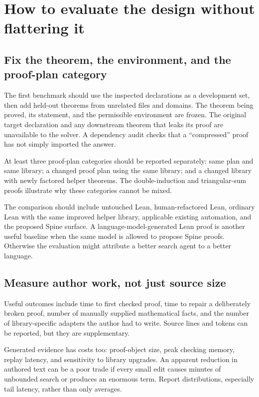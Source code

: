 \documentclass[11pt,letterpaper]{article}
\theoremstyle{definition}
\theoremstyle{remark}
\newcommand{\Spine}{Spine}
\begin{document}
\section{How to evaluate the design without flattering it}
\label{sec:evaluation}
\subsection{Fix the theorem, the environment, and the proof-plan category}
The first benchmark should use the inspected declarations as a development set, then add held-out theorems from unrelated files and domains. The theorem being proved, its statement, and the permissible environment are frozen. The original target declaration and any downstream theorem that leaks its proof are unavailable to the solver. A dependency audit checks that a ``compressed'' proof has not simply imported the answer.

At least three proof-plan categories should be reported separately: same plan and same library; a changed proof plan using the same library; and a changed library with newly factored helper theorems. The double-induction and triangular-sum proofs illustrate why these categories cannot be mixed.

The comparison should include untouched Lean, human-refactored Lean, ordinary Lean with the same improved helper library, applicable existing automation, and the proposed \Spine{} surface. A language-model-generated Lean proof is another useful baseline when the same model is allowed to propose \Spine{} proofs. Otherwise the evaluation might attribute a better search agent to a better language.

\subsection{Measure author work, not just source size}
Useful outcomes include time to first checked proof, time to repair a deliberately broken proof, number of manually supplied mathematical facts, and the number of library-specific adapters the author had to write. Source lines and tokens can be reported, but they are supplementary.

Generated evidence has costs too: proof-object size, peak checking memory, replay latency, and sensitivity to library upgrades. An apparent reduction in authored text can be a poor trade if every small edit causes minutes of unbounded search or produces an enormous term. Report distributions, especially tail latency, rather than only averages.
\end{document}
